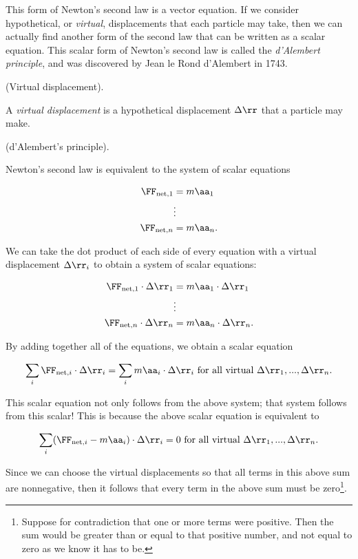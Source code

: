 \documentclass{article}
\begin{document}
This form of Newton's second law is a vector equation. If we consider hypothetical, or \textit{virtual}, displacements that each particle may take, then we can actually find another form of the second law that can be written as a scalar equation. This scalar form of Newton's second law is called the \textit{d'Alembert principle}, and was discovered by Jean le Rond d'Alembert in 1743.

\begin{defn}
    (Virtual displacement).

    A \textit{virtual displacement} is a hypothetical displacement $\Delta \rr$ that a particle may make.
\end{defn}

\begin{deriv}
    (d'Alembert's principle).

    Newton's second law is equivalent to the system of scalar equations

    \begin{align*}
        \FF_{\text{net}, 1} &= m\aa_1 \\
        &\vdots \\
        \FF_{\text{net}, n} &= m\aa_n.
    \end{align*}

    We can take the dot product of each side of every equation with a virtual displacement $\Delta \rr_i$ to obtain a system of scalar equations:

    \begin{align*}
        \FF_{\text{net}, 1} \cdot \Delta \rr_1 &= m\aa_1 \cdot \Delta \rr_1 \\
        &\vdots \\
        \FF_{\text{net}, n} \cdot \Delta \rr_n &= m\aa_n \cdot \Delta \rr_n.
    \end{align*}

    By adding together all of the equations, we obtain a scalar equation

    \begin{align*}
        \sum_i \FF_{\text{net},i} \cdot \Delta \rr_i = \sum_i m\aa_i \cdot \Delta \rr_i \text{ for all virtual $\Delta \rr_1, ..., \Delta \rr_n$}.
    \end{align*}

    This scalar equation not only follows from the above system; that system follows from this scalar! This is because the above scalar equation is equivalent to

    \begin{align*}
        \sum_i (\FF_{\text{net},i} - m\aa_i) \cdot \Delta \rr_i = 0 \text{ for all virtual $\Delta \rr_1, ..., \Delta \rr_n$}.
    \end{align*}

    Since we can choose the virtual displacements so that all terms in this above sum are nonnegative, then it follows that every term in the above sum must be zero\footnote{Suppose for contradiction that one or more terms were positive. Then the sum would be greater than or equal to that positive number, and not equal to zero as we know it has to be.}.
\end{deriv}
\end{document}
